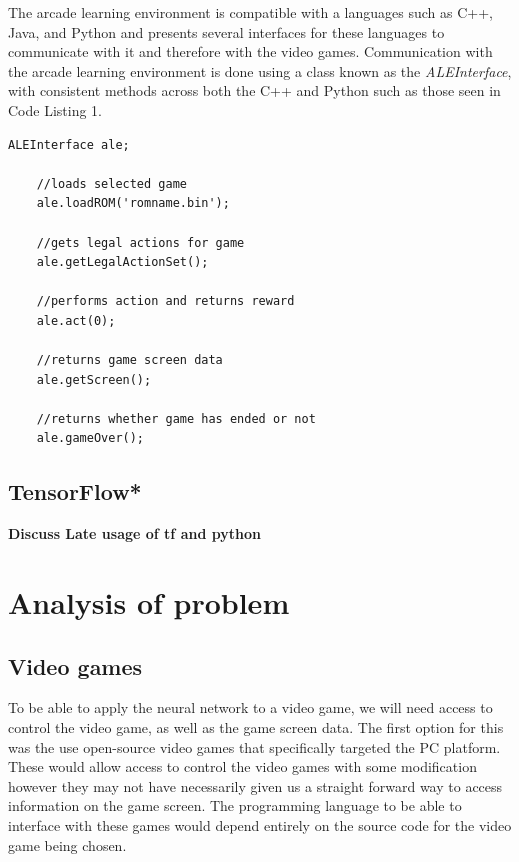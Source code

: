 \documentclass[10pt]{article}
\begin{document}
		The arcade learning environment is compatible with a languages such as C++, Java, and Python and presents several interfaces for these languages to communicate with it and therefore with the video games. Communication with the arcade learning environment is done using a class known as the \textit{ALEInterface}, with consistent methods across both the C++ and Python such as those seen in Code Listing 1.\\
		
		\renewcommand{\lstlistingname}{Code Listing}
			\begin{lstlisting}[caption={Arcade Learning Environment I/O},label={ALEIO}]	
	ALEInterface ale;

	//loads selected game
	ale.loadROM('romname.bin'); 

	//gets legal actions for game
	ale.getLegalActionSet();

	//performs action and returns reward
	ale.act(0);

	//returns game screen data
	ale.getScreen();

	//returns whether game has ended or not
	ale.gameOver();
			\end{lstlisting}
	\bigskip
	
	\subsection{TensorFlow*}
	\textbf{Discuss Late usage of tf and python}
	
	\bigskip

\section{Analysis of problem}
	
	\subsection{Video games}
		To be able to apply the neural network to a video game, we will need access to control the video game, as well as the game screen data. The first option for this was the use open-source video games that specifically targeted the PC platform. These would allow access to control the video games with some modification however they may not have necessarily given us a straight forward way to access information on the game screen. The programming language to be able to interface with these games would depend entirely on the source code for the video game being chosen.\\
		
\end{document}
